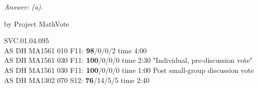 {\it Answer:  (a).}  

\medskip

by Project MathVote

SVC.01.04.095 \\
AS DH MA1561 010 F11: {\bf 98}/0/0/2 time 4:00  \\
AS DH MA1561 030 F11: {\bf 100}/0/0/0 time 2:30 "Individual, pre-discussion vote" \\
AS DH MA1561 030 F11: {\bf 100}/0/0/0 time 1:00 Post small-group discussion vote \\
AS DH MA1302 070 S12: {\bf 76}/14/5/5 time 2:40  \\

